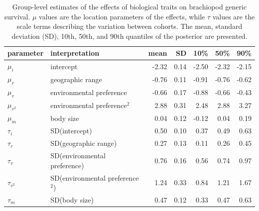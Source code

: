 \documentclass{article}
\begin{document}
\begin{table}[h]
  \centering
  \caption{Group-level estimates of the effects of biological traits on brachiopod generic survival. \(\mu\) values are the location parameters of the effects, while \(\tau\) values are the scale terms describing the variation between cohorts. The mean, standard deviation (SD), 10th, 50th, and 90th quantiles of the posterior are presented.}
  \begin{tabular}{ l l r r r r r }
    \hline
    parameter & interpretation & mean & SD & 10\% & 50\% & 90\% \\ 
    \hline
    \(\mu_{i}\) & intercept & -2.32 & 0.14 & -2.50 & -2.32 & -2.15 \\ 
    \(\mu_{r}\) & geographic range & -0.76 & 0.11 & -0.91 & -0.76 & -0.62 \\ 
    \(\mu_{v}\) & environmental preference & -0.66 & 0.17 & -0.88 & -0.66 & -0.43 \\ 
    \(\mu_{v^{2}}\) & environmental preference\(^{2}\) & 2.88 & 0.31 & 2.48 & 2.88 & 3.27 \\ 
    \(\mu_{m}\) & body size & 0.04 & 0.12 & -0.12 & 0.04 & 0.19 \\ 
    \(\tau_{i}\) & SD(intercept) & 0.50 & 0.10 & 0.37 & 0.49 & 0.63 \\ 
    \(\tau_{r}\) & SD(geographic range) &  0.27 & 0.13 & 0.11 & 0.26 & 0.45 \\ 
    \(\tau_{v}\) & SD(environmental preference) & 0.76 & 0.16 & 0.56 & 0.74 & 0.97 \\ 
    \(\tau_{v^{2}}\) & SD(environmental preference\(^{2}\)) & 1.24 & 0.33 & 0.84 & 1.21 & 1.67 \\ 
    \(\tau_{m}\) & SD(body size) & 0.47 & 0.12 & 0.33 & 0.47 & 0.63 \\ 
    \hline
  \end{tabular}
  \label{tab:param}
\end{table}


\clearpage
\end{document}
